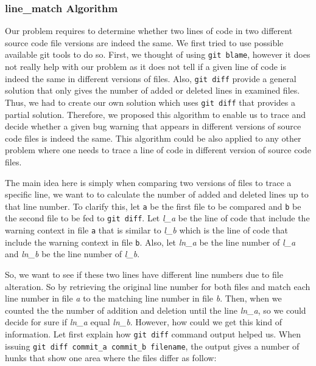 \subsubsection{\textbf{line\_match Algorithm}\label{alg}}
Our problem requires to determine whether two  lines of code  in two different source code file versions are indeed the same. We first tried to use possible available git tools to do so. First, we thought of using \texttt{git blame}, however it does not really help with our problem as it does not tell if a given line of code is indeed the same in different versions of files. Also, \texttt{git diff} provide a general solution that only gives the number of added or deleted lines in examined files. Thus, we had to create our own solution which uses \texttt{git diff} that provides a partial solution. Therefore, we proposed this algorithm to enable us to trace and decide whether a given bug warning that appears in different versions of source code files is indeed the same. This algorithm could be also applied to any other problem where one needs to trace a line of code in different version of source code files. 

The main idea here is simply when  comparing two versions of files to trace a specific line, we want to to calculate the number of added and deleted lines up to that line number. To clarify this, let \texttt{a} be the first file to be compared and \texttt{b} be the second file to be fed to \texttt{git diff}.  Let \textit{l\_a} be the line of code that include the warning context in file \texttt{a} that is similar to \textit{l\_b} which is the line of code that include the warning context in file \texttt{b}. Also, let \textit{ln\_a} be the line number of \textit{l\_a} and  \textit{ln\_b} be the line number of \textit{l\_b}. 


 
So, we want to see if these two lines  have different line numbers  due to file alteration. So by retrieving the original line number for both files and match each line number in file \textit{a} to the matching line number in  file \textit{b}. Then, when we counted the the number of addition and deletion until the line \textit{ln\_a}, so we could decide for sure if \textit{ln\_a} equal \textit{ln\_b}. However, how could we get this kind of information. Let first explain how \texttt{git diff} command output helped us. When issuing \texttt{git diff  commit\_a commit\_b filename}, the output gives a number of hunks that show one area where the files differ as follow:

